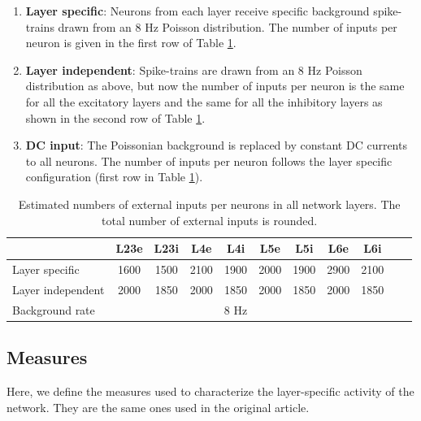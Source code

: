 \documentclass[10pt,a4paper,onecolumn]{article}
\begin{document}
\begin{enumerate}
\item \textbf{Layer specific}: Neurons from each layer receive specific background spike-trains drawn from an $8$ Hz Poisson distribution. The number of inputs per neuron is given in the first row of Table \ref{table:externalinput}.
\item \textbf{Layer independent}: Spike-trains are drawn from an $8$ Hz Poisson distribution as above, but now the number of inputs per neuron is the same for all the excitatory layers and the same for all the inhibitory layers as shown in the second row of Table \ref{table:externalinput}.
\item \textbf{DC input}: The Poissonian background is replaced by constant DC currents to all neurons. The number of inputs per neuron follows the layer specific configuration (first row in Table \ref{table:externalinput}). 
\end{enumerate}

\begin{table}[!ht]
\caption{\label{table:externalinput} Estimated numbers of external inputs per neurons in all network layers. The total number of external inputs is rounded.
}
\begin{center}
\begin{tabular}{lcccccccccc}
 \toprule
 \midrule
 & L23e & L23i & L4e & L4i & L5e & L5i & L6e & L6i %
 \tabularnewline
 \midrule
 Layer specific & 1600 & 1500 & 2100 & 1900 & 2000 & 1900 & 2900 & 2100 \tabularnewline
 Layer independent & 2000 & 1850 & 2000 & 1850 & 2000 & 1850 & 2000 & 1850 \tabularnewline
 Background rate  & & & & 8 Hz \tabularnewline
\bottomrule
\end{tabular}
\end{center}
\end{table}

\subsection{Measures}

Here, we define the measures used to characterize the layer-specific activity of the network. They are the same ones used in the original article.  
\end{document}
